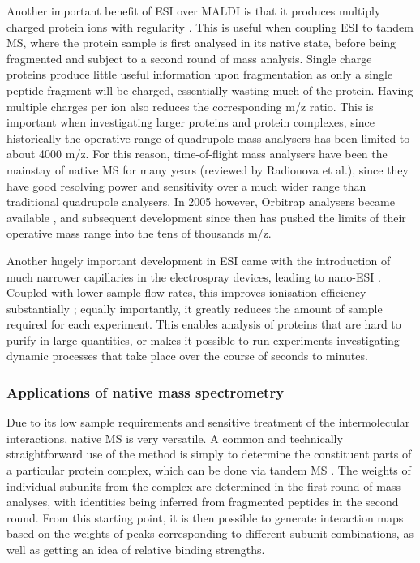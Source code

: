 \documentclass[a4paper,11pt,twoside,openright]{scrbook}
\begin{document}
Another important benefit of ESI over MALDI is that it produces multiply charged protein ions with regularity \cite{Krusemark2009}. This is useful when coupling ESI to tandem MS, where the protein sample is first analysed in its native state, before being fragmented and subject to a second round of mass analysis. Single charge proteins produce little useful information upon fragmentation as only a single peptide fragment will be charged, essentially wasting much of the protein. Having multiple charges per ion also reduces the corresponding m/z ratio. This is important when investigating larger proteins and protein complexes, since historically the operative range of quadrupole mass analysers has been limited to about 4000 m/z. For this reason, time-of-flight mass analysers have been the mainstay of native MS for many years (reviewed by Radionova et al.\cite{Radionova2016}), since they have good resolving power and sensitivity over a much wider range than traditional quadrupole analysers. In 2005 however, Orbitrap analysers became available \cite{Hu2005}, and subsequent development since then has pushed the limits of their operative mass range into the tens of thousands m/z.

Another hugely important development in ESI came with the introduction of much narrower capillaries in the electrospray devices, leading to nano-ESI \cite{Wilm1994}. Coupled with lower sample flow rates, this improves ionisation efficiency substantially \cite{El-Faramawy2005}; equally importantly, it greatly reduces the amount of sample required for each experiment. This enables analysis of proteins that are hard to purify in large quantities, or makes it possible to run experiments investigating dynamic processes that take place over the course of seconds to minutes.

\subsubsection{Applications of native mass spectrometry}
Due to its low sample requirements and sensitive treatment of the intermolecular interactions, native MS is very versatile. A common and technically straightforward use of the method is simply to determine the constituent parts of a particular protein complex, which can be done via tandem MS \cite{Sobott2002,Hernandez2007}. The weights of individual subunits from the complex are determined in the first round of mass analyses, with identities being inferred from fragmented peptides in the second round. From this starting point, it is then possible to generate interaction maps based on the weights of peaks corresponding to different subunit combinations, as well as getting an idea of relative binding strengths.
\end{document}
